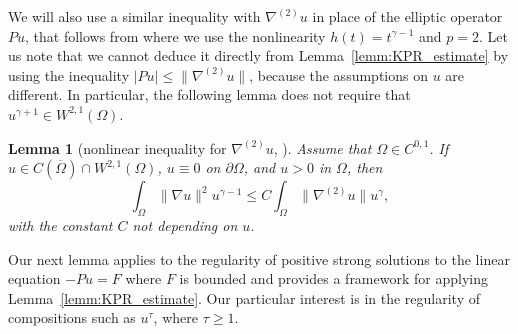 \documentclass[12pt,a4paper]{amsart}
\newtheorem{lemma}[theorem]{\bf Lemma}
\theoremstyle{definition}
\begin{document}
We will also use a similar inequality with $\nabla^{(2)}u$ in place of the elliptic operator $Pu$, that follows from \cite[Theorem~3.2 and Remark~3.1]{MR3867979} where we use the nonlinearity $h(t) = t^{\gamma-1}$ and $p=2$. Let us note that we cannot deduce it directly from Lemma~\ref{lemm:KPR_estimate} by using the inequality $|Pu|\le\|\nabla^{(2)}u\|$, because the assumptions on $u$ are different. In particular, the following lemma does not require that $u^{\gamma+1} \in W^{2,1}(\Omega)$.

\begin{lemma}[nonlinear inequality for $\nabla^{(2)}u$, \cite{MR3867979}]\label{withTomasz}
Assume that $\Omega\in C^{0,1}$. If $u\in C(\overline{\Omega})\cap W^{2,1}(\Omega)$, $u\equiv 0$ on $\partial\Omega$, and $u>0$ in $\Omega$, then
  \begin{equation*}
        \int_\Omega \|\nabla u\|^2 u^{\gamma -1} \le C  \int_\Omega \| \nabla^{(2)}u \| u^\gamma ,
    \end{equation*}
    with the constant $C$ not depending on $u$. 
\end{lemma}


Our next lemma applies to the regularity of positive strong solutions to the linear equation $-Pu=F$ where $F$ is bounded and provides a framework for applying Lemma~\ref{lemm:KPR_estimate}. Our particular interest is in the regularity of compositions such as $u^\tau$, where $\tau\ge 1$.
\end{document}
